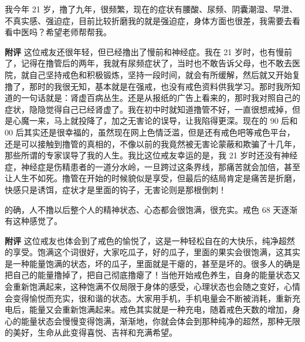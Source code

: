 \begin{case}
    我今年 21 岁，撸了九年，很频繁，现在的症状有腰酸、尿频、阴囊潮湿、早泄、不真实感、强迫症，目前比较折磨我的就是强迫症，身体方面也很差，我需要去看看中医吗？希望老师帮帮我。

    \textbf{附评} 这位戒友还很年轻，但已经撸出了慢前和神经症。我在 21 岁时，也有慢前了，记得在撸管后的两年，我就有尿频症状了，当时也不敢告诉父母，也不敢去医院，就自己坚持戒色和积极锻炼，坚持一段时间，就会有所缓解，然后就又开始复撸了，那时的我很无知，基本就是在强戒，也没有戒色资料供我学习。那时我所知道的一句话就是：肾虚百病丛生。还是从报纸的广告上看来的，那时我对照自己的症状，隐隐觉得自己已经肾虚了。我在初中时就知道撸管不好，一直很想戒掉，但是心魔一来，马上就投降了，加之无害论的误导，让我陷得更深。现在的 90 后和 00 后其实还是很幸福的，虽然现在网上色情泛滥，但是还有戒色吧等戒色平台，还是可以接触到撸管的真相的，不像以前的我竟然被无害论蒙蔽和欺骗了十几年，那些所谓的专家误导了我的人生。我比这位戒友幸运的是，我 21 岁时还没有神经症，神经症是伤精患者的一道分水岭，一旦跨过这条界线，那痛苦就会加倍，甚至让人生不如死。撸管在开始的时候貌似是享受，但最后的结局肯定是痛苦是折磨，快感只是诱饵，症状才是里面的钩子，无害论则是那根倒刺！
\end{case}

\begin{case}
    的确，人不撸以后整个人的精神状态、心态都会很饱满，很充实。戒色 68 天逐渐有这种感觉了。

    \textbf{附评} 这位戒友也体会到了戒色的愉悦了，这是一种轻松自在的大快乐，纯净超然的享受。饱满这个词很好，大家吃瓜子，好的瓜子，里面的果实会很饱满，这其实是一种能量饱满的状态，坏的瓜子，里面就是干瘪的，甚至是坏的。很多人的确是把自己的能量撸掉了，把自己彻底撸瘪了！当他开始戒色养生，自身的能量状态又会重新饱满起来，这种饱满不仅局限于身体的感受，心理状态也会随之变好，心情会变得愉悦而充实，很和谐的状态。大家用手机，手机电量会不断被消耗，重新充电后，能量又会重新饱满起来。戒色其实就是一种充电，随着戒色天数的增加，身心的能量状态会慢慢变得饱满，渐渐地，你就会体会到那种纯净的超然，那种无限的美好，生命从此变得喜悦、吉祥和充满希望。
\end{case}

